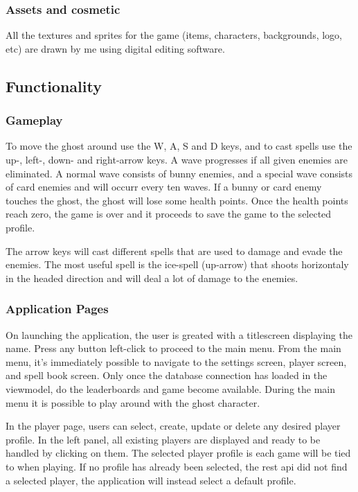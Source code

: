 \documentclass[12pt]{article}
\begin{document}
        \subsubsection{Assets and cosmetic}

        All the textures and sprites for the game (items, characters, backgrounds, logo, etc) are drawn by me using digital editing software.

    \subsection{Functionality}

        \subsubsection{Gameplay}

        To move the ghost around use the W, A, S and D keys, and to cast spells use the up-, left-, down- and right-arrow keys. A wave progresses if all given enemies are eliminated. A normal wave consists of bunny enemies, and a special wave consists of card enemies and will occurr every ten waves. If a bunny or card enemy touches the ghost, the ghost will lose some health points. Once the health points reach zero, the game is over and it proceeds to save the game to the selected profile. 

        The arrow keys will cast different spells that are used to damage and evade the enemies. The most useful spell is the ice-spell (up-arrow) that shoots horizontaly in the headed direction and will deal a lot of damage to the enemies.

        \subsubsection{Application Pages}

        On launching the application, the user is greated with a titlescreen displaying the name. Press any button left-click to proceed to the main menu. From the main menu, it's immediately possible to navigate to the settings screen, player screen, and spell book screen. Only once the database connection has loaded in the viewmodel, do the leaderboards and game become available. During the main menu it is possible to play around with the ghost character.

        In the player page, users can select, create, update or delete any desired player profile. In the left panel, all existing players are displayed and ready to be handled by clicking on them. The selected player profile is each game will be tied to when playing. If no profile has already been selected, the rest api did not find a selected player, the application will instead select a default profile.
\end{document}
